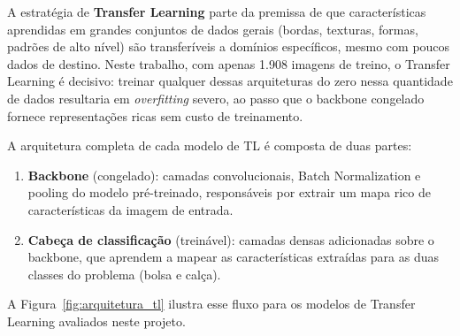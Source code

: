 \documentclass[12pt,a4paper]{article}
\begin{document}
A estratégia de \textbf{Transfer Learning} \cite{pan2009survey,yosinski2014transferable}
parte da premissa de que características aprendidas em grandes conjuntos de dados
gerais (bordas, texturas, formas, padrões de alto nível) são transferíveis a
domínios específicos, mesmo com poucos dados de destino. Neste trabalho, com
apenas 1.908 imagens de treino, o Transfer Learning é decisivo: treinar qualquer
dessas arquiteturas do zero nessa quantidade de dados resultaria em
\emph{overfitting} severo, ao passo que o backbone congelado fornece
representações ricas sem custo de treinamento.

A arquitetura completa de cada modelo de TL é composta de duas partes:

\begin{enumerate}
  \item \textbf{Backbone} (congelado): camadas convolucionais, Batch Normalization
        e pooling do modelo pré-treinado, responsáveis por extrair um mapa rico
        de características da imagem de entrada.
  \item \textbf{Cabeça de classificação} (treinável): camadas densas adicionadas
        sobre o backbone, que aprendem a mapear as características extraídas para
        as duas classes do problema (bolsa e calça).
\end{enumerate}

A Figura~\ref{fig:arquitetura_tl} ilustra esse fluxo para os modelos de
Transfer Learning avaliados neste projeto.
\end{document}
